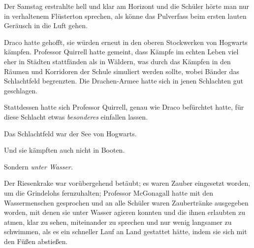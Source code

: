 Der Samstag erstrahlte hell und klar am Horizont und die Schüler hörte man nur in verhaltenem Flüsterton sprechen, als könne das Pulverfass beim ersten lauten Geräusch in die Luft gehen.

\later

Draco hatte gehofft, sie würden erneut in den oberen Stockwerken von Hogwarts kämpfen. Professor Quirrell hatte gemeint, dass Kämpfe im echten Leben viel eher in Städten stattfänden als in Wäldern, was durch das Kämpfen in den Räumen und Korridoren der Schule simuliert werden sollte, wobei Bänder das Schlachtfeld begrenzten. Die Drachen-Armee hatte sich in jenen Schlachten gut geschlagen.

Stattdessen hatte sich Professor Quirrell, genau wie Draco befürchtet hatte, für diese Schlacht etwas \emph{besonderes} einfallen lassen.

Das Schlachtfeld war der See von Hogwarts.

Und sie kämpften auch nicht in Booten.

Sondern \emph{unter Wasser.}

Der Riesenkrake war vorübergehend betäubt; es waren Zauber eingesetzt worden, um die Grindelohs fernzuhalten; Professor McGonagall hatte mit den Wassermenschen gesprochen und an alle Schüler waren Zaubertränke ausgegeben worden, mit denen sie unter Wasser agieren konnten und die ihnen erlaubten zu atmen, klar zu sehen, miteinander zu sprechen und nur wenig langsamer zu schwimmen, als es ein schneller Lauf an Land gestattet hätte, indem sie sich mit den Füßen abstießen.

